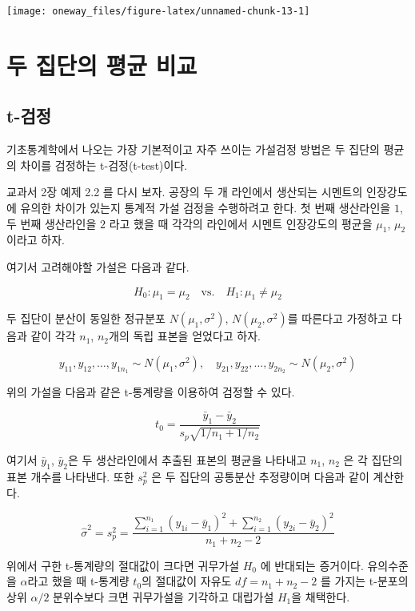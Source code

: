 \documentclass[
]{book}
\begin{document}
\begin{center}\texttt{[image: oneway\_files/figure-latex/unnamed-chunk-13-1]} \end{center}

\hypertarget{ttest}{%
\chapter{두 집단의 평균 비교}\label{ttest}}

\hypertarget{t-uxac80uxc815}{%
\section{t-검정}\label{t-uxac80uxc815}}

기초통계학에서 나오는 가장 기본적이고 자주 쓰이는 가설검정 방법은 두 집단의 평균의 차이를
검정하는 t-검정(t-test)이다.

교과서 2장 예제 2.2 를 다시 보자. 공장의 두 개 라인에서 생산되는 시멘트의 인장강도에 유의한 차이가 있는지 통계적 가설 검정을 수행하려고 한다. 첫 번째 생산라인을 \(1\), 두 번째 생산라인을 \(2\) 라고 했을 때 각각의 라인에서 시멘트 인장강도의 평균을 \(\mu_1\), \(\mu_2\)이라고 하자.

여기서 고려해야할 가설은 다음과 같다.

\[ H_0: \mu_1 = \mu_2 \quad \text{vs.} \quad H_1: \mu_1  \ne \mu_2 \]

두 집단이 분산이 동일한 정규분포 \(N(\mu_1, \sigma^2)\), \(N(\mu_2, \sigma^2)\)를 따른다고 가정하고
다음과 같이 각각 \(n_1\), \(n_2\)개의 독립 표본을 얻었다고 하자.

\[ y_{11}, y_{12}, \dots, y_{1 n_1} \sim N(\mu_1, \sigma^2), \quad y_{21}, y_{22}, \dots, y_{2 n_2} \sim N(\mu_2, \sigma^2) \]

위의 가설을 다음과 같은 t-통계량을 이용하여 검정할 수 있다.

\[ t_0 =\frac {\bar y_1 -\bar y_2 } {  s_p \sqrt{1/n_1 + 1/n_2}} \]

여기서 \(\bar y_1\), \(\bar y_2\)은 두 생산라인에서 추출된 표본의 평균을 나타내고 \(n_1\), \(n_2\) 은 각 집단의 표본 개수를 나타낸다. 또한 \(s_p^2\) 은 두 집단의 공통분산 추정량이며 다음과 같이 계산한다.

\[ \hat \sigma^2 = s_p^2 =  \frac { \sum_{i=1}^{n_1} (y_{1i} -\bar y_1)^2 + \sum_{i=1}^{n_2} (y_{2i} -\bar y_2)^2 } { n_1 + n_2 -2} \]

위에서 구한 t-통계량의 절대값이 크다면 귀무가설 \(H_0\) 에 반대되는 증거이다. 유의수준을 \(\alpha\)라고 했을 때 t-통계량 \(t_0\)의 절대값이 자유도 \(df=n_1 + n_2 -2\) 를 가지는 t-분포의 상위 \(\alpha/2\) 분위수보다 크면 귀무가설을 기각하고 대립가설 \(H_1\)을 채택한다.
\end{document}
